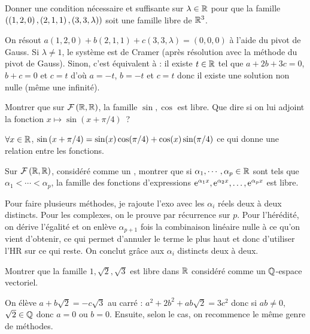 \documentclass{magnolia}
\begin{document}
\begin{exos}
\exo Donner une condition nécessaire et suffisante sur
  $\lambda\in\mathbb{R}$ pour que la famille $(\left(1,2,0\right), \left(2,1,1\right), \left(3,3,\lambda\right))$
  soit une famille libre de $\mathbb{R}^3$.
  \begin{sol} On résout $a(1,2,0)+b(2,1,1)+c(3,3,\lambda)=(0,0,0)$ à l'aide du pivot de Gauss.
  Si $\lambda\neq 1$, le système est de Cramer (après résolution avec la méthode du pivot de Gauss). Sinon, c'est équivalent à : il existe $t\in \mathbb{R}$ tel que $a+2b+3c=0$, $b+c=0$ et $c=t$ d'où $a=-t$, $b=-t$ et $c=t$ donc il existe une solution non nulle (même une infinité).
  \end{sol}
\exo Montrer que sur $\mathcal{F}\left(\mathbb{R},\mathbb{R}\right)$, la famille $\sin,\cos$
  est libre. Que dire si on lui adjoint la fonction
  $x\mapsto\sin(x+\pi/4)$~?
  \begin{sol}
  $\forall x \in \mathbb{R}$, $\sin\left(x+\pi/4\right)=\sin(x)\cos(\pi/4)+\cos(x)\sin(\pi/4)$ ce qui donne une relation entre les fonctions.
  \end{sol} 
\exo Sur $\mathcal{F}\left(\mathbb{R},\mathbb{R}\right)$, considéré comme un \Rev, montrer que si
  $\alpha_1,\cdots,\alpha_p\in\mathbb{R}$ sont tels que $\alpha_1<\cdots<\alpha_p$, la famille des fonctions d'expressions
  ${\rm e}^{\alpha_1 x},{\rm e}^{\alpha_2 x},\ldots,{\rm e}^{\alpha_p x}$ est libre.
  \begin{sol}
  Pour faire plusieurs méthodes, je rajoute l'exo avec les $\alpha_i$ réels deux à deux distincts.
  Pour les complexes, on le prouve par récurrence sur $p$. Pour l'hérédité, on dérive l'égalité et on enlève $\alpha_{p+1}$ fois la combinaison linéaire nulle à ce qu'on vient d'obtenir, ce qui permet d'annuler le terme le plus haut et donc d'utiliser l'HR sur ce qui reste. On conclut grâce aux $\alpha_i$ distincts deux à deux.
  \end{sol}
\exo Montrer que la famille $1,\sqrt{2},\sqrt{3}$ est libre dans $\mathbb{R}$
  considéré comme un $\mathbb{Q}$-espace vectoriel.
  \begin{sol}
  On élève $a+b\sqrt{2}=-c\sqrt{3}$ au carré :
  $a^2+2b^2+ab\sqrt{2}=3c^2$ donc si $ab\neq 0$, $\sqrt{2}\in \mathbb{Q}$ donc $a=0$ ou $b=0$. Ensuite, selon le cas, on recommence le même genre de méthodes.
  \end{sol}
\end{exos}
\end{document}
